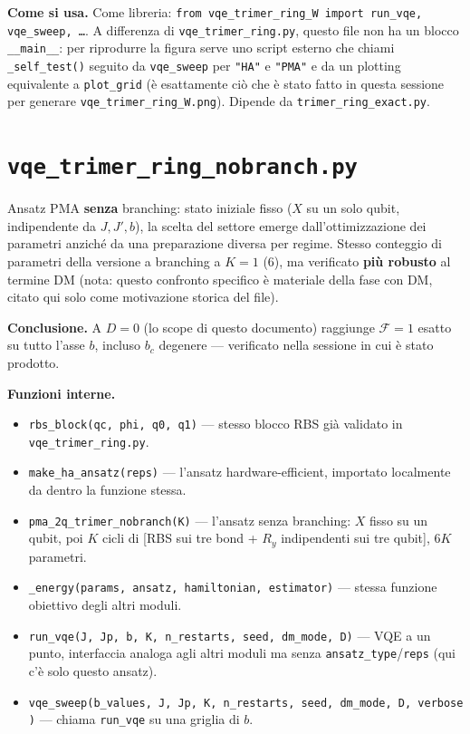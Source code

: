 \documentclass[11pt,a4paper]{article}
\begin{document}
\textbf{Come si usa.} Come libreria: \texttt{from vqe\_trimer\_ring\_W import
run\_vqe, vqe\_sweep, \ldots}. A differenza di \texttt{vqe\_trimer\_ring.py}, questo
file non ha un blocco \texttt{\_\_main\_\_}: per riprodurre la figura serve uno
script esterno che chiami \texttt{\_self\_test()} seguito da \texttt{vqe\_sweep} per
\texttt{"HA"} e \texttt{"PMA"} e da un plotting equivalente a \texttt{plot\_grid} (è
esattamente ciò che è stato fatto in questa sessione per generare
\texttt{vqe\_trimer\_ring\_W.png}). Dipende da \texttt{trimer\_ring\_exact.py}.

\section*{\texttt{vqe\_trimer\_ring\_nobranch.py}}

Ansatz PMA \textbf{senza} branching: stato iniziale fisso ($X$ su un solo qubit,
indipendente da $J,J',b$), la scelta del settore emerge dall'ottimizzazione dei
parametri anziché da una preparazione diversa per regime. Stesso conteggio di
parametri della versione a branching a $K=1$ (6), ma verificato \textbf{più robusto}
al termine DM (nota: questo confronto specifico è materiale della fase con DM, citato
qui solo come motivazione storica del file).

\textbf{Conclusione.} A $D=0$ (lo scope di questo documento) raggiunge $\mathcal F=1$
esatto su tutto l'asse $b$, incluso $b_c$ degenere — verificato nella sessione in cui è
stato prodotto.

\textbf{Funzioni interne.}
\begin{itemize}
\item \texttt{rbs\_block(qc,\ phi,\ q0,\ q1)} — stesso blocco RBS già validato in
\texttt{vqe\_trimer\_ring.py}.
\item \texttt{make\_ha\_ansatz(reps)} — l'ansatz hardware-efficient, importato
localmente da \texttt{} dentro la funzione stessa.
\item \texttt{pma\_2q\_trimer\_nobranch(K)} — l'ansatz senza branching: $X$ fisso su
un qubit, poi $K$ cicli di [RBS sui tre bond + $R_y$ indipendenti sui tre qubit],
$6K$ parametri.
\item \texttt{\_energy(params,\ ansatz,\ hamiltonian,\ estimator)} — stessa funzione
obiettivo degli altri moduli.
\item \texttt{run\_vqe(J,\ Jp,\ b,\ K,\ n\_restarts,\ seed,\ dm\_mode,\ D)} — VQE a
un punto, interfaccia analoga agli altri moduli ma senza \texttt{ansatz\_type}/\texttt{reps}
(qui c'è solo questo ansatz).
\item \texttt{vqe\_sweep(b\_values,\ J,\ Jp,\ K,\ n\_restarts,\ seed,\ dm\_mode,\
D,\ verbose)} — chiama \texttt{run\_vqe} su una griglia di $b$.
\end{itemize}
\end{document}
